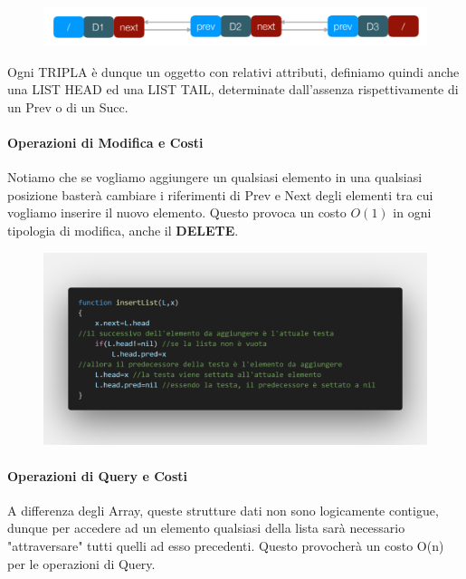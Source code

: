 \documentclass{article}
\begin{document}
\begin{figure}[htbp]
    \center
    \includegraphics[scale=0.45]{img/linkedList.png}
\end{figure}

Ogni TRIPLA è dunque un oggetto con relativi attributi, definiamo quindi anche una LIST HEAD ed una LIST TAIL, determinate dall'assenza rispettivamente di un Prev o di un Succ.

\paragraph{Operazioni di Modifica e Costi} Notiamo che se vogliamo aggiungere un qualsiasi elemento in una qualsiasi posizione basterà cambiare i riferimenti di Prev e Next degli elementi tra cui vogliamo inserire il nuovo elemento. Questo provoca un costo \(O(1)\) in ogni tipologia di modifica, anche il \textbf{DELETE}.

\begin{figure}[htbp]
    \center
    \includegraphics[scale=0.28]{img/queueOperazioni1.png}
\end{figure}

\newpage

\paragraph{Operazioni di Query e Costi} A differenza degli Array, queste strutture dati non sono logicamente contigue, dunque per accedere ad un elemento qualsiasi della lista sarà necessario "attraversare" tutti quelli ad esso precedenti.
Questo provocherà un costo O(n) per le operazioni di Query. 
\end{document}
